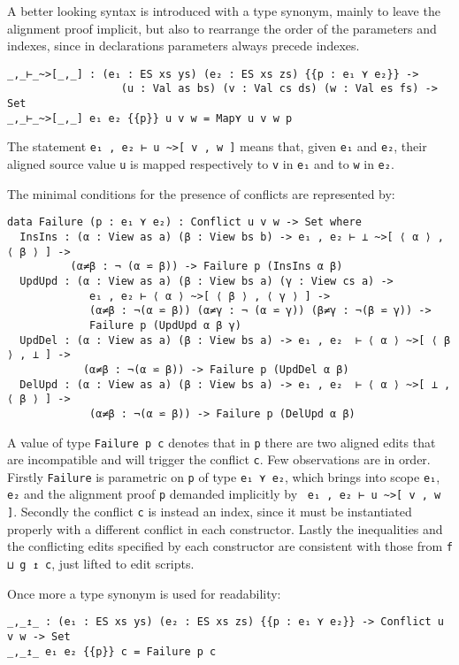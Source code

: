 \documentclass[../Thesis.tex]{subfiles}
\begin{document}
	A better looking syntax is introduced with a type synonym, mainly
	to leave the alignment proof implicit, but also to rearrange the order
	of the parameters and indexes, since in declarations parameters
	always precede indexes.
	
\begin{verbatim}
_,_⊢_~>[_,_] : (e₁ : ES xs ys) (e₂ : ES xs zs) {{p : e₁ ⋎ e₂}} -> 
                  (u : Val as bs) (v : Val cs ds) (w : Val es fs) -> Set
_,_⊢_~>[_,_] e₁ e₂ {{p}} u v w = Map⋎ u v w p
\end{verbatim}

	The statement \texttt{e₁ , e₂ ⊢ u \textasciitilde>[ v , w ]} means that, given
	\texttt{e₁} and \texttt{e₂}, their aligned source value \texttt{u} is mapped
	respectively to \texttt{v} in \texttt{e₁} and to \texttt{w} in \texttt{e₂}.

	The minimal conditions for the presence of conflicts are represented
	by:
\begin{verbatim}
data Failure (p : e₁ ⋎ e₂) : Conflict u v w -> Set where
  InsIns : (α : View as a) (β : View bs b) -> e₁ , e₂ ⊢ ⊥ ~>[ ⟨ α ⟩ , ⟨ β ⟩ ] ->
          (α≠β : ¬ (α ⋍ β)) -> Failure p (InsIns α β)
  UpdUpd : (α : View as a) (β : View bs a) (γ : View cs a) -> 
             e₁ , e₂ ⊢ ⟨ α ⟩ ~>[ ⟨ β ⟩ , ⟨ γ ⟩ ] ->
             (α≠β : ¬(α ⋍ β)) (α≠γ : ¬ (α ⋍ γ)) (β≠γ : ¬(β ⋍ γ)) -> 
             Failure p (UpdUpd α β γ)
  UpdDel : (α : View as a) (β : View bs a) -> e₁ , e₂  ⊢ ⟨ α ⟩ ~>[ ⟨ β ⟩ , ⊥ ] ->
            (α≠β : ¬(α ⋍ β)) -> Failure p (UpdDel α β)
  DelUpd : (α : View as a) (β : View bs a) -> e₁ , e₂  ⊢ ⟨ α ⟩ ~>[ ⊥ ,  ⟨ β ⟩ ] ->
             (α≠β : ¬(α ⋍ β)) -> Failure p (DelUpd α β)
\end{verbatim}

	A value of type \texttt{Failure p c} denotes that in \texttt{p} there are
	two aligned edits that are incompatible and will trigger the conflict 
	\texttt{c}.
	Few observations are in order.
	Firstly \texttt{Failure} is parametric on \texttt{p} of type \texttt{e₁ ⋎ e₂}, 
	which brings into scope \texttt{e₁}, \texttt{e₂} and the alignment proof 
	\texttt{p} demanded 
	implicitly by \texttt{ e₁ , e₂ ⊢ u \textasciitilde>[ v , w ]}.
	Secondly the conflict \texttt{c} is instead an index, since it must be
	instantiated properly with a different conflict in each constructor.
	Lastly the inequalities and the conflicting edits specified by each 
	constructor are consistent with those from \texttt{f ⊔ g ↥ c}, just lifted to
	edit scripts.

	Once more a type synonym is used for readability:
\begin{verbatim}
_,_↥_ : (e₁ : ES xs ys) (e₂ : ES xs zs) {{p : e₁ ⋎ e₂}} -> Conflict u v w -> Set
_,_↥_ e₁ e₂ {{p}} c = Failure p c 
\end{verbatim}
	
\end{document}
